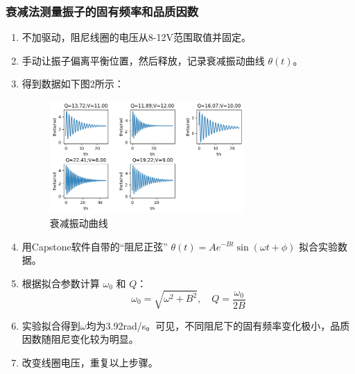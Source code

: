 \documentclass[UTF8]{ctexart}
\begin{document}
\subsubsection{衰减法测量振子的固有频率和品质因数}
\begin{enumerate}
    \item 不加驱动，阻尼线圈的电压从8-12V范围取值并固定。
    \item 手动让振子偏离平衡位置，然后释放，记录衰减振动曲线 $\theta(t)$。
    \item 得到数据如下图2所示：
    
\begin{figure}[htbp]
    \centering
    \includegraphics[width=0.7\textwidth]{Q.png}
    \caption{衰减振动曲线}
    \label{fig:Q}
\end{figure}

    \item 用Capstone软件自带的“阻尼正弦” $\theta(t) = Ae^{-Bt} \sin(\omega t + \phi)$ 拟合实验数据。
    \item 根据拟合参数计算 $\omega_0$ 和 $Q$：
    \begin{equation}
    \omega_0 = \sqrt{\omega^2 + B^2}, \quad Q = \frac{\omega_0}{2B}
    \end{equation}
    \item 实验拟合得到\(\omega\)均为3.92rad/s。可见，不同阻尼下的固有频率变化极小，品质因数随阻尼变化较为明显。
    \item 改变线圈电压，重复以上步骤。
\end{enumerate}
\end{document}
